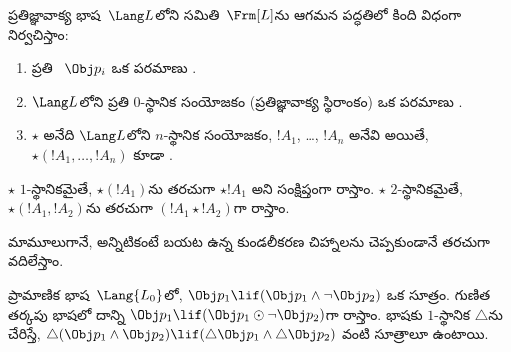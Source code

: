 \documentclass[../../../include/open-logic-section]{subfiles}
\begin{document}


\begin{defn}[సూత్రం]
ప్రతిజ్ఞావాక్య భాష~$\Lang L$లోని \emph{}
సమితి~$\Frm[L]$ను ఆగమన పద్ధతిలో కింది విధంగా నిర్వచిస్తాం:
\begin{enumerate}
\item ప్రతి ~$\Obj p_i$
  ఒక పరమాణు .
\item $\Lang L$లోని ప్రతి $0$-స్థానిక సంయోజకం (ప్రతిజ్ఞావాక్య స్థిరాంకం)
ఒక పరమాణు .
\item $\star$ అనేది $\Lang L$లోని $n$-స్థానిక సంయోజకం,
$!A_1$, \dots, $!A_n$ అనేవి  అయితే,
$\star(!A_1, \dots, !A_n)$ కూడా .
\end{enumerate}
$\star$ $1$-స్థానికమైతే, $\star(!A_1)$ను తరచుగా
$\star !A_1$ అని సంక్షిప్తంగా రాస్తాం. $\star$ $2$-స్థానికమైతే,
$\star(!A_1,!A_2)$ను తరచుగా $(!A_1 \star !A_2)$గా రాస్తాం.
\end{defn}

మామూలుగానే, అన్నిటికంటే బయట ఉన్న కుండలీకరణ చిహ్నాలను
చెప్పకుండానే తరచుగా వదిలేస్తాం.

\begin{ex}
  ప్రామాణిక భాష~$\Lang{L_0}$లో, $\Obj p_1 \lif (\Obj p_1
  \land \lnot \Obj p_2)$ ఒక సూత్రం. గుణిత తర్కపు భాషలో దాన్ని
  $\Obj p_1 \lif (\Obj p_1 \odot
  \lnot \Obj p_2)$గా రాస్తాం. భాషకు $1$-స్థానిక
  $\triangle$ను చేరిస్తే,
  $\triangle (\Obj p_1
  \land \Obj p_2) \lif (\triangle \Obj p_1 \land \triangle \Obj p_2)$
  వంటి సూత్రాలూ ఉంటాయి.
\end{ex}
\end{document}
